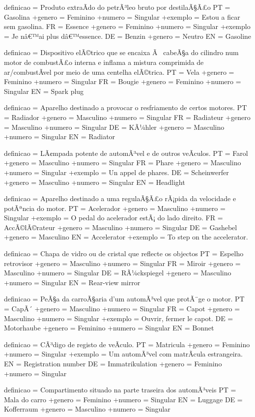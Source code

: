 \documentclass[a4paper]{article}
\begin{document}
definicao = Produto extraÃ\-do do petrÃ³leo bruto por destilaÃ§Ã£o
PT = Gasolina
+genero = Feminino
+numero = Singular
+exemplo = Estou a ficar sem gasolina.
FR = Essence
+genero = Feminino
+numero = Singular
+exemplo = Je nâ€™ai plus dâ€™essence.
DE = Benzin
+genero = Neutro
EN = Gasoline

definicao = Dispositivo elÃ©trico que se encaixa Ã  cabeÃ§a do cilindro num motor de combustÃ£o interna e inflama a mistura comprimida de ar/combustÃ\-vel por meio de uma centelha elÃ©trica.
PT = Vela
+genero = Feminino
+numero = Singular
FR = Bougie
+genero = Feminino
+numero = Singular
EN = Spark plug

definicao = Aparelho destinado a provocar o resfriamento de certos motores.
PT = Radiador
+genero = Masculino
+numero = Singular
FR = Radiateur
+genero = Masculino
+numero = Singular
DE = KÃ¼hler
+genero = Masculino
+numero = Singular
EN = Radiator

definicao = LÃ¢mpada potente de automÃ³vel e de outros veÃ\-culos.
PT = Farol
+genero = Masculino
+numero = Singular
FR = Phare
+genero = Masculino
+numero = Singular
+exemplo = Un appel de phares.
DE = Scheinwerfer
+genero = Masculino
+numero = Singular
EN = Headlight

definicao = Aparelho destinado a uma regulaÃ§Ã£o rÃ¡pida da velocidade e potÃªncia do motor.
PT = Acelerador
+genero = Masculino
+numero = Singular
+exemplo = O pedal do acelerador estÃ¡ do lado direito.
FR = AccÃ©lÃ©rateur
+genero = Masculino
+numero = Singular
DE = Gashebel
+genero = Masculino
EN = Accelerator
+exemplo = To step on the accelerator.

definicao = Chapa de vidro ou de cristal que reflecte os objectos
PT = Espelho retrovisor
+genero = Masculino
+numero = Singular
FR = Miroir
+genero = Masculino
+numero = Singular
DE = RÃ¼ckspiegel
+genero = Masculino
+numero = Singular
EN = Rear-view mirror

definicao = PeÃ§a da carroÃ§aria d'um automÃ³vel que protÃ¨ge o motor.
PT = CapÃ´
+genero = Masculino
+numero = Singular
FR = Capot
+genero = Masculino
+numero = Singular
+exemplo = Ouvrir, fermer le capot.
DE = Motorhaube
+genero = Feminino
+numero = Singular
EN = Bonnet

definicao = CÃ³digo de registo de veÃ\-culo.
PT = Matricula
+genero = Feminino
+numero = Singular
+exemplo = Um automÃ³vel com matrÃ\-cula estrangeira.
EN = Registration number
DE = Immatrikulation
+genero = Feminino
+numero = Singular

definicao = Compartimento situado na parte traseira dos automÃ³veis
PT = Mala do carro
+genero = Feminino
+numero = Singular
EN = Luggage
DE = Kofferraum
+genero = Masculino
+numero = Singular
\end{document}
